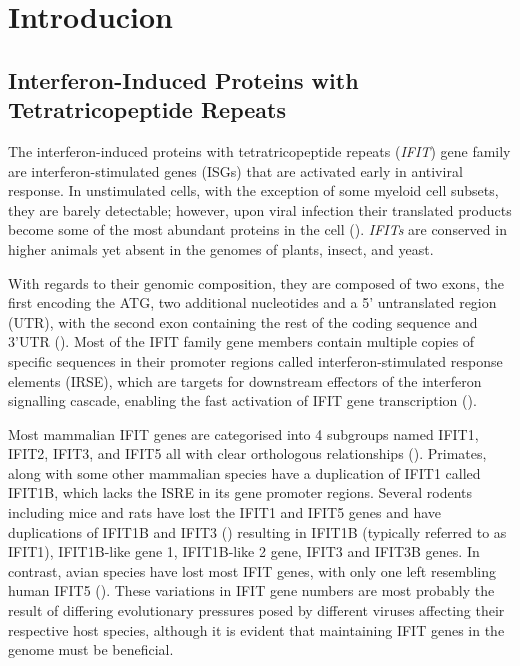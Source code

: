 \chapter{Introducion} \label{ch:Introduction}
\section{Interferon-Induced Proteins with Tetratricopeptide Repeats} \label{sec:Interferon-Induced Proteins with Tetratricopeptide Repeats}
The interferon-induced proteins with tetratricopeptide repeats (\textit{IFIT}) gene family are interferon-stimulated genes (ISGs) that are activated early in antiviral response. In unstimulated cells, with the exception of some myeloid cell subsets, they are barely detectable; however, upon viral infection their translated products become some of the most abundant proteins in the cell (\cite{Diamond2013TheProteins}). \textit{IFITs} are conserved in higher animals yet absent in the genomes of plants, insect, and yeast. 

With regards to their genomic composition, they are composed of two exons, the first encoding the ATG, two additional nucleotides and a 5’ untranslated region (UTR), with the second exon containing the rest of the coding sequence and 3’UTR (\cite{deVeer1998IFI60/ISG60/IFIT4Genes}). Most of the IFIT family gene members contain multiple copies of specific sequences in their promoter regions called interferon-stimulated response elements (IRSE), which are targets for downstream effectors of the interferon signalling cascade, enabling the fast activation of IFIT gene transcription (\cite{Lou2009Ifr-9/stat2Stat1}).   

Most mammalian IFIT genes are categorised into 4 subgroups named IFIT1, IFIT2, IFIT3, and IFIT5 all with clear orthologous relationships (\cite{Sarkar2004NovelGenes}). Primates, along with some other mammalian species have a duplication of IFIT1 called IFIT1B, which lacks the ISRE in its gene promoter regions. Several rodents including mice and rats have lost the IFIT1 and IFIT5 genes and have duplications of IFIT1B and IFIT3 (\cite{Daugherty2016Evolution-guidedMammals.}) resulting in IFIT1B (typically referred to as IFIT1), IFIT1B-like gene 1, IFIT1B-like 2 gene, IFIT3 and IFIT3B genes. In contrast, avian species have lost most IFIT genes, with only one left resembling human IFIT5 (\cite{Liu2013Lineage-SpecificFamily}). These variations in IFIT gene numbers are most probably the result of differing evolutionary pressures posed by different viruses affecting their respective host species, although it is evident that maintaining IFIT genes in the genome must be beneficial. 





